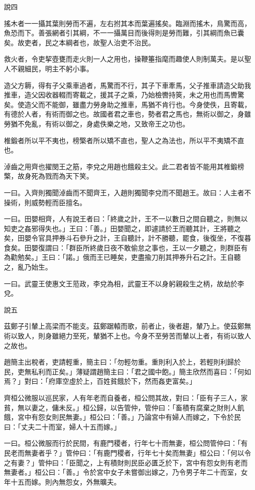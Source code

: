 \begin{pinyinscope}
說四

搖木者一一攝其葉則勞而不遍，左右拊其本而葉遍搖矣。臨淵而搖木，鳥驚而高，魚恐而下。善張網者引其綱，不一一攝萬目而後得則是勞而難，引其綱而魚已囊矣。故吏者，民之本綱者也，故聖人治吏不治民。

救火者，令吏挈壺甕而走火則一人之用也，操鞭箠指麾而趣使人則制萬夫。是以聖人不親細民，明主不躬小事。

造父方耨，得有子父乘車過者，馬驚而不行，其子下車牽馬，父子推車請造父助我推車，造父因收器輟而寄載之，援其子之乘，乃始檢轡持筴，未之用也而馬轡驚矣。使造父而不能御，雖盡力勞身助之推車，馬猶不肯行也。今身使佚，且寄載，有德於人者，有術而御之也。故國者君之車也，勢者君之馬也，無術以御之，身雖勞猶不免亂，有術以御之，身處佚樂之地，又致帝王之功也。

椎鍛者所以平不夷也，榜檠者所以矯不直也，聖人之為法也，所以平不夷矯不直也。

淖齒之用齊也擢閔王之筋，李兌之用趙也餓殺主父。此二君者皆不能用其椎鍛榜檠，故身死為戮而為天下笑。

一曰。入齊則獨聞淖齒而不聞齊王，入趙則獨聞李兌而不聞趙王。故曰：人主者不操術，則威勢輕而臣擅名。

一曰。田嬰相齊，人有說王者曰：「終歲之計，王不一以數日之間自聽之，則無以知吏之姦邪得失也。」王曰：「善。」田嬰聞之，即遽請於王而聽其計，王將聽之矣，田嬰令官具押券斗石參升之計，王自聽計，計不勝聽，罷食，後復坐，不復暮食矣。田嬰復謂曰：「群臣所終歲日夜不敢偷怠之事也，王以一夕聽之，則群臣有為勸勉矣。」王曰：「諾。」俄而王已睡矣，吏盡揄刀削其押券升石之計。王自聽之，亂乃始生。

一曰。武靈王使惠文王蒞政，李兌為相，武靈王不以身躬親殺生之柄，故劫於李兌。

說五

茲鄭子引輦上高梁而不能支。茲鄭踞轅而歌，前者止，後者趨，輦乃上。使茲鄭無術以致人，則身雖絕力至死，輦猶不上也。今身不至勞苦而輦以上者，有術以致人之故也。

趙簡主出稅者，吏請輕重，簡主曰：「勿輕勿重。重則利入於上，若輕則利歸於民，吏無私利而正矣。」薄疑謂趙簡主曰：「君之國中飽。」簡主欣然而喜曰：「何如焉？」對曰：「府庫空虛於上，百姓貧餓於下，然而姦吏富矣。」

齊桓公微服以巡民家，人有年老而自養者，桓公問其故，對曰：「臣有子三人，家貧，無以妻之，傭未反。」桓公歸，以告管仲，管仲曰：「畜積有腐棄之財則人飢餓，宮中有怨女則民無妻。」桓公曰：「善。」乃論宮中有婦人而嫁之，下令於民曰：「丈夫二十而室，婦人十五而嫁。」

一曰。桓公微服而行於民間，有鹿門稷者，行年七十而無妻，桓公問管仲曰：「有民老而無妻者乎？」管仲曰：「有鹿門稷者，行年七十矣而無妻」桓公曰：「何以令之有妻？」管仲曰：「臣聞之，上有積財則民臣必匱乏於下，宮中有怨女則有老而無妻者。」桓公曰：「善。」令於宮中女子未嘗御出嫁之，乃令男子年二十而室，女年十五而嫁。則內無怨女，外無曠夫。


\end{pinyinscope}
